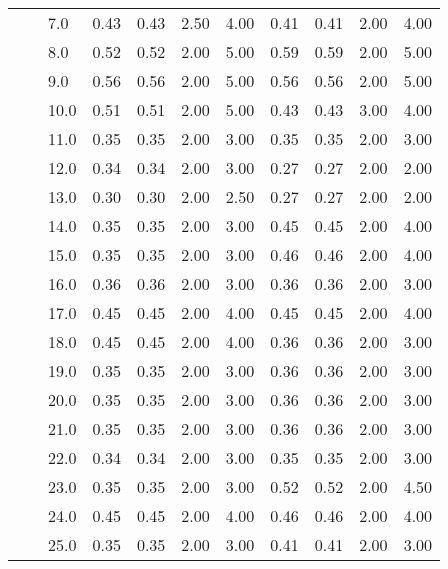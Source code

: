 \begin{tabular}{lllrrrrrrrr}
   &     & 7.0  &       0.43 &      0.43 & 2.50 &   4.00 &       0.41 &      0.41 & 2.00 &   4.00 \\
   &     & 8.0  &       0.52 &      0.52 & 2.00 &   5.00 &       0.59 &      0.59 & 2.00 &   5.00 \\
   &     & 9.0  &       0.56 &      0.56 & 2.00 &   5.00 &       0.56 &      0.56 & 2.00 &   5.00 \\
   &     & 10.0 &       0.51 &      0.51 & 2.00 &   5.00 &       0.43 &      0.43 & 3.00 &   4.00 \\
   &     & 11.0 &       0.35 &      0.35 & 2.00 &   3.00 &       0.35 &      0.35 & 2.00 &   3.00 \\
   &     & 12.0 &       0.34 &      0.34 & 2.00 &   3.00 &       0.27 &      0.27 & 2.00 &   2.00 \\
   &     & 13.0 &       0.30 &      0.30 & 2.00 &   2.50 &       0.27 &      0.27 & 2.00 &   2.00 \\
   &     & 14.0 &       0.35 &      0.35 & 2.00 &   3.00 &       0.45 &      0.45 & 2.00 &   4.00 \\
   &     & 15.0 &       0.35 &      0.35 & 2.00 &   3.00 &       0.46 &      0.46 & 2.00 &   4.00 \\
   &     & 16.0 &       0.36 &      0.36 & 2.00 &   3.00 &       0.36 &      0.36 & 2.00 &   3.00 \\
   &     & 17.0 &       0.45 &      0.45 & 2.00 &   4.00 &       0.45 &      0.45 & 2.00 &   4.00 \\
   &     & 18.0 &       0.45 &      0.45 & 2.00 &   4.00 &       0.36 &      0.36 & 2.00 &   3.00 \\
   &     & 19.0 &       0.35 &      0.35 & 2.00 &   3.00 &       0.36 &      0.36 & 2.00 &   3.00 \\
   &     & 20.0 &       0.35 &      0.35 & 2.00 &   3.00 &       0.36 &      0.36 & 2.00 &   3.00 \\
   &     & 21.0 &       0.35 &      0.35 & 2.00 &   3.00 &       0.36 &      0.36 & 2.00 &   3.00 \\
   &     & 22.0 &       0.34 &      0.34 & 2.00 &   3.00 &       0.35 &      0.35 & 2.00 &   3.00 \\
   &     & 23.0 &       0.35 &      0.35 & 2.00 &   3.00 &       0.52 &      0.52 & 2.00 &   4.50 \\
   &     & 24.0 &       0.45 &      0.45 & 2.00 &   4.00 &       0.46 &      0.46 & 2.00 &   4.00 \\
   &     & 25.0 &       0.35 &      0.35 & 2.00 &   3.00 &       0.41 &      0.41 & 2.00 &   3.00 \\

\end{tabular}
